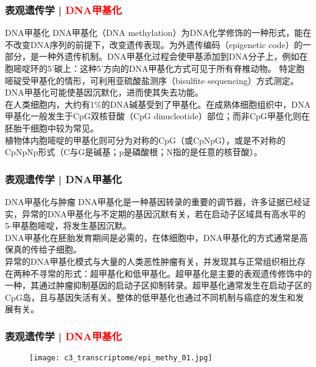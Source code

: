 \begin{frame}
  \frametitle{表观遗传学 | \textcolor{red}{DNA甲基化}}
  \begin{block}{DNA甲基化}
    DNA甲基化（DNA methylation）为DNA化学修饰的一种形式，能在不改变DNA序列的前提下，改变遗传表现。为外遗传编码（epigenetic code）的一部分，是一种外遗传机制。DNA甲基化过程会使甲基添加到DNA分子上，例如在胞嘧啶环的5'碳上：这种5'方向的DNA甲基化方式可见于所有脊椎动物。 特定胞嘧碇受甲基化的情形，可利用亚硫酸盐测序（bisulfite sequencing）方式测定。DNA甲基化可能使基因沉默化，进而使其失去功能。\\
    \vspace{0.5em}
    在人类细胞内，大约有1\%的DNA碱基受到了甲基化。在成熟体细胞组织中，DNA甲基化一般发生于CpG双核苷酸（CpG dinucleotide）部位；而非CpG甲基化则在胚胎干细胞中较为常见。\\
    \vspace{0.5em}
    植物体内胞嘧啶的甲基化则可分为对称的CpG（或CpNpG），或是不对称的CpNpNp形式（C与G是碱基；p是磷酸根；N指的是任意的核苷酸）。
  \end{block}
\end{frame}

\begin{frame}
  \frametitle{表观遗传学 | DNA甲基化}
  \begin{block}{DNA甲基化与肿瘤}
 DNA甲基化是一种基因转录的重要的调节器，许多证据已经证实，异常的DNA甲基化与不定期的基因沉默有关，若在启动子区域具有高水平的5-甲基胞嘧啶，将发生基因沉默。\\
 \vspace{0.5em}
DNA甲基化在胚胎发育期间是必需的，在体细胞中，DNA甲基化的方式通常是高保真的传给子细胞。\\
 \vspace{0.5em}
异常的DNA甲基化模式与大量的人类恶性肿瘤有关，并发现其与正常组织相比存在两种不寻常的形式：超甲基化和低甲基化。超甲基化是主要的表观遗传修饰中的一种，其通过肿瘤抑制基因的启动子区抑制转录。超甲基化通常发生在启动子区的CpG岛，且与基因失活有关。整体的低甲基化也通过不同机制与癌症的发生和发展有关。 
  \end{block}
\end{frame}

\begin{frame}
  \frametitle{表观遗传学 | \textcolor{red}{DNA甲基化}}
  \begin{figure}
    \centering
    \texttt{[image: c3\_transcriptome/epi\_methy\_01.jpg]}
  \end{figure}
\end{frame}

